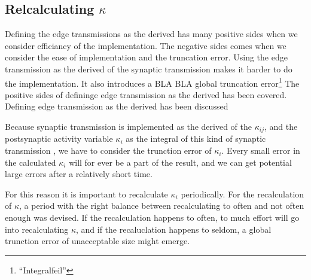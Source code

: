 		\subsection{Relcalculating $\kappa$}
		\label{ssecRecalcKappa}
		Defining the edge transmissions as the derived has many positive sides when we consider efficiancy of the implementation. The negative sides comes when we consider the ease of implementation and the truncation error.
		Using the edge transmission as the derived of the synaptic transmission makes it harder to do the implementation. 
		It also introduces a BLA BLA  global truncation error\footnote{``Integralfeil''}
		The positive sides of defininge edge transmission as the derived has been covered. 
		Defining edge transmission as the derived has been discussed 	




		Because synaptic transmission is implemented as the derived of the $\kappa_{ij}$, and the postsynaptic activity variable $\kappa_i$ as the integral of this kind of synaptic transmission
		, we have to consider the trunction error of $\kappa_i$. 
		Every small error in the calculated $\kappa_i$ will for ever be a part of the result, and we can get potential large errors after a relatively short time.

		For this reason it is important to recalculate $\kappa_i$ periodically.
		For the recalculation of $\kappa$, a period with the right balance between recalculating to often and not often enough was devised.
		If the recalculation happens to often, to much effort will go into recalculating $\kappa$, and if the recaluclation happens to seldom, a global trunction error of unacceptable size might emerge.

